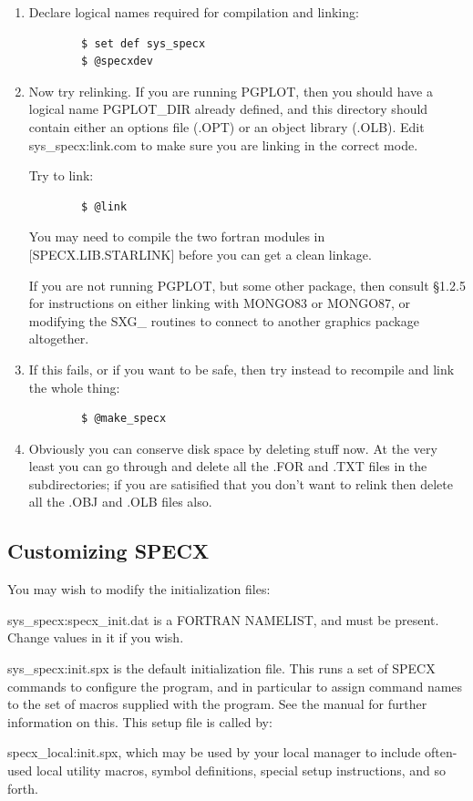 \documentclass[11pt,twoside]{report}
\begin{document}
\begin{enumerate}
\item Declare logical names required for compilation and linking:

\begin{verbatim}
        $ set def sys_specx
        $ @specxdev
\end{verbatim}

\item Now try relinking. If you are running PGPLOT, then you should have
a logical name PGPLOT\_DIR already defined, and this directory should
contain either an options file (.OPT) or an object library (.OLB).
Edit sys\_specx:link.com to make sure you are linking in the correct
mode.

Try to link:
 
\begin{verbatim}
        $ @link
\end{verbatim}

You may need to compile the two fortran modules in [SPECX.LIB.STARLINK]
before you can get a clean linkage.

If you are not running PGPLOT, but some other package, then consult
\S1.2.5 for instructions on either linking with MONGO83
or MONGO87, or modifying the SXG\_ routines to connect to another
graphics package altogether.

\item If this fails, or if you want to be safe, then try instead to recompile
and link the whole thing:

\begin{verbatim}
        $ @make_specx
\end{verbatim}

\item Obviously you can conserve disk space by deleting stuff now. At the
very least you can go through and delete all the .FOR and .TXT
files in the subdirectories; if you are satisified that you don't
want to relink then delete all the .OBJ and .OLB files also.

\end{enumerate}

\subsection{Customizing SPECX}

You may wish to modify the initialization files:

\begin{description}
\item{sys\_specx:specx\_init.dat} is a FORTRAN NAMELIST, and must be present.
Change values in it if you wish.
\item{sys\_specx:init.spx} is the default initialization file. This runs
a set of SPECX commands to configure the program, and in particular to
assign command names to the set of macros supplied with the program. See
the manual for further information on this. This setup file is called by:
\item{specx\_local:init.spx}, which may be used by your local manager to include
often-used local utility macros, symbol definitions, special setup instructions,
and so forth.
\end{description}
\end{document}
